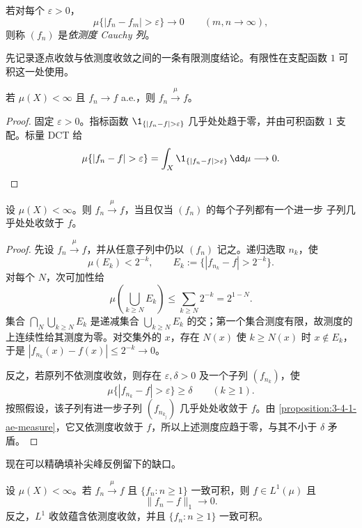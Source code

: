 \begin{definition}\label{def:3-4-1-3}
若对每个 $\varepsilon>0$，
\[
 \mu\{|f_n-f_m|>\varepsilon\}\longrightarrow0
 \qquad(m,n\to\infty),
\]
则称 $(f_n)$ 是\emph{依测度 Cauchy 列}。
\end{definition}

先记录逐点收敛与依测度收敛之间的一条有限测度结论。有限性在支配函数 $1$ 可积这一处使用。

\begin{proposition}[几乎处处收敛蕴含依测度收敛]\label{proposition:3-4-1-ae-measure}
若 $\mu(X)<\infty$ 且 $f_n\to f$ a.e.，则 $f_n\xrightarrow{\mu}f$。
\end{proposition}

\begin{proof}
固定 $\varepsilon>0$。指标函数
$\1_{\{|f_n-f|>\varepsilon\}}$ 几乎处处趋于零，并由可积函数 $1$ 支配。标量 DCT 给
\[
 \mu\{|f_n-f|>\varepsilon\}
 =\int_X\1_{\{|f_n-f|>\varepsilon\}}\,\dd\mu\longrightarrow0.
\]
\end{proof}

\begin{proposition}[子列原理]\label{proposition:3-4-1-1}
设 $\mu(X)<\infty$。则 $f_n\xrightarrow{\mu}f$，当且仅当 $(f_n)$ 的每个子列都有一个进一步
子列几乎处处收敛于 $f$。
\end{proposition}

\begin{proof}
先设 $f_n\xrightarrow{\mu}f$，并从任意子列中仍以 $(f_n)$ 记之。递归选取 $n_k$，使
\[
  \mu(E_k)<2^{-k},\qquad
  E_k:=\{|f_{n_k}-f|>2^{-k}\}.
\]
对每个 $N$，次可加性给
\[
 \mu\!\left(\bigcup_{k\ge N}E_k\right)
 \le\sum_{k\ge N}2^{-k}=2^{1-N}.
\]
集合 $\bigcap_N\bigcup_{k\ge N}E_k$ 是递减集合
$\bigcup_{k\ge N}E_k$ 的交；第一个集合测度有限，故测度的上连续性给其测度为零。对交集外的
$x$，存在 $N(x)$ 使 $k\ge N(x)$ 时 $x\notin E_k$，于是
$|f_{n_k}(x)-f(x)|\le2^{-k}\to0$。

反之，若原列不依测度收敛，则存在 $\varepsilon,\delta>0$ 及一个子列 $(f_{n_k})$，使
\[
  \mu\{|f_{n_k}-f|>\varepsilon\}\ge\delta\qquad(k\ge1).
\]
按照假设，该子列有进一步子列 $(f_{n_{k_j}})$ 几乎处处收敛于 $f$。由
\cref{proposition:3-4-1-ae-measure}，它又依测度收敛于 $f$，所以上述测度应趋于零，与其不小于
$\delta$ 矛盾。
\end{proof}

现在可以精确填补尖峰反例留下的缺口。

\begin{theorem}\label{theorem:3-4-1-2}
设 $\mu(X)<\infty$。若 $f_n\xrightarrow{\mu}f$ 且 $\{f_n:n\ge1\}$ 一致可积，则
$f\in L^1(\mu)$ 且
\[
  \|f_n-f\|_1\longrightarrow0.
\]
反之，$L^1$ 收敛蕴含依测度收敛，并且 $\{f_n:n\ge1\}$ 一致可积。
\end{theorem}

